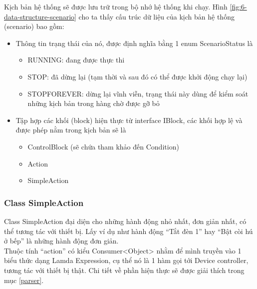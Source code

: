 \documentclass[12pt,a4paper,oneside]{extbook}
\begin{document}
\noindent
Kịch bản hệ thống sẽ được lưu trữ trong bộ nhớ hệ thống khi chạy. Hình \ref{fig:6-data-structure-scenario} cho ta thấy cấu trúc dữ liệu của kịch bản hệ thống (scenario) bao gồm:

\begin{itemize}[topsep=1mm,itemsep=-0.5mm]
\item Thông tin trạng thái của nó, được định nghĩa bằng 1 enum ScenarioStatus là

	\begin{itemize}[topsep=1mm,itemsep=-0.5mm]
	\item RUNNING: đang được thực thi
	\item STOP: đã dừng lại (tạm thời và sau đó có thể được khởi động chạy lại)
	\item STOP\textunderscore FOREVER: dừng lại vĩnh viễn, trạng thái này dùng để kiểm soát những kịch bản trong hàng chờ được gỡ bỏ
	\vspace{1mm}
	\end{itemize}

\item Tập hợp các khối (block) hiện thực từ interface IBlock, các khối hợp lệ và được phép nằm trong kịch bản sẽ là

	\begin{itemize}[topsep=1mm,itemsep=-0.5mm]
	\item ControlBlock (sẽ chứa tham khảo đến Condition)
	\item Action
	\item SimpleAction
	\vspace{1mm}
	\end{itemize}
	
\vspace{1mm}
\end{itemize}

\subsubsection{Class SimpleAction}

Class SimpleAction đại diện cho những hành động nhỏ nhất, đơn giản nhất, có thể tương tác với thiết bị. Lấy ví dụ như hành động “Tắt đèn 1” hay “Bật còi hú ở bếp” là những hành động đơn giản.\\

\noindent
Thuộc tính “action” có kiểu Consumer<Object> nhằm để mình truyền vào 1 biểu thức dạng Lamda Expression, cụ thể nó là 1 hàm gọi tới Device controller, tương tác với thiết bị thật. Chi tiết về phần hiện thực sẽ được giải thích trong mục \ref{parser}.
\end{document}
